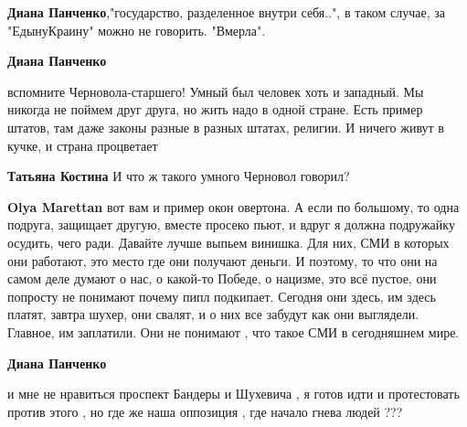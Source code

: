 \begin{itemize}
\begin{itemize}
\textbf{Диана Панченко},"государство, разделенное
внутри себя..", в таком случае, за "ЕдынуКраину" можно не говорить.
"Вмерла".

 
\textbf{Диана Панченко} 

вспомните Черновола-старшего! Умный был человек хоть и западный. Мы никогда не
поймем друг друга, но жить надо в одной стране. Есть пример штатов, там даже
законы разные в разных штатах, религии. И ничего живут в кучке, и страна
процветает


 
\textbf{Татьяна Костина} И что ж такого умного Черновол говорил?

 
\textbf{Olya Marettan} вот вам и пример окон овертона. А если по большому, то
одна подруга, защищает другую, вместе просеко пьют, и вдруг я должна подружайку
осудить, чего ради. Давайте лучше выпьем винишка. Для них, СМИ в которых они
работают, это место где они получают деньги. И поэтому, то что они на самом
деле думают о нас, о какой-то Победе, о нацизме, это всё пустое, они попросту
не понимают почему пипл подкипает. Сегодня они здесь, им здесь платят, завтра
шухер, они свалят, и о них все забудут как они выглядели. Главное, им
заплатили. Они не понимают , что такое СМИ в сегодняшнем мире.


 
\textbf{Диана Панченко} 

и мне не нравиться проспект Бандеры и Шухевича , я готов идти и протестовать
против этого , но где же наша оппозиция , где начало гнева людей ??? 


\end{itemize}
\end{itemize}
